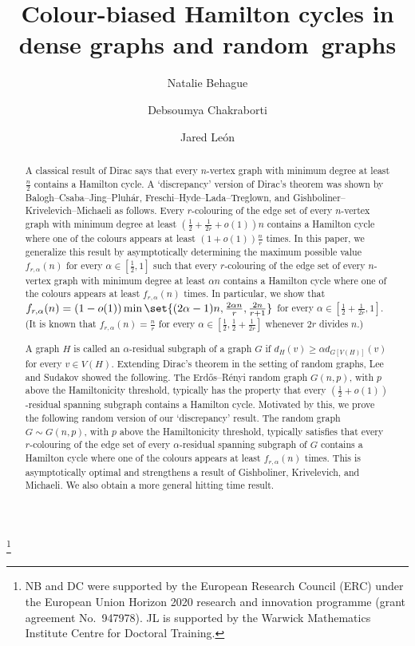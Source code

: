 \documentclass[10pt,a4paper,reqno]{amsart}
\begin{document}
\title{Colour-biased Hamilton cycles in dense graphs and random~graphs}

\author[Behague]{Natalie Behague}
\author[Chakraborti]{Debsoumya Chakraborti}
\author[León]{Jared León}

\address{Mathematics Institute, University of Warwick, Coventry, UK}

\thanks{NB and DC were supported by the European Research Council (ERC) under the European Union Horizon 2020 research and innovation programme (grant agreement No.\ 947978). JL is supported by the Warwick Mathematics Institute Centre for Doctoral Training.}

\begin{abstract}
A classical result of Dirac says that every $n$-vertex graph with minimum degree at least $\frac{n}{2}$ contains a Hamilton cycle. A `discrepancy' version of Dirac's theorem was shown by Balogh--Csaba--Jing--Pluh\'ar, Freschi--Hyde--Lada--Treglown, and Gishboliner--Krivelevich--Michaeli as follows. Every $r$-colouring of the edge set of every $n$-vertex graph with minimum degree at least $(\frac{1}{2} + \frac{1}{2r} + o(1))n$ contains a Hamilton cycle where one of the colours appears at least $(1+o(1))\frac{n}{r}$ times. In this paper, we generalize this result by asymptotically determining the maximum possible value $f_{r,\alpha}(n)$ for every $\alpha \in [\frac{1}{2}, 1]$ such that every $r$-colouring of the edge set of every $n$-vertex graph with minimum degree at least $\alpha n$ contains a Hamilton cycle where one of the colours appears at least $f_{r,\alpha}(n)$ times. In particular, we show that $f_{r,\alpha}(n) = (1-o(1)) \min\set{(2\alpha - 1)n, \frac{2\alpha n}{r}, \frac{2n}{r+1}}$ for every $\alpha\in [\frac{1}{2} + \frac{1}{2r}, 1]$. (It is known that $f_{r,\alpha}(n) = \frac{n}{r}$ for every $\alpha\in [\frac{1}{2},\frac{1}{2} + \frac{1}{2r}]$ whenever $2r$ divides $n$.)


A graph $H$ is called an $\alpha$-residual subgraph of a graph $G$ if $d_H(v)\ge \alpha d_{G[V(H)]}(v)$ for every $v\in V(H)$. Extending Dirac's theorem in the setting of random graphs, Lee and Sudakov showed the following. The Erd\H{o}s--R\'enyi random graph $G(n,p)$, with $p$ above the Hamiltonicity threshold, typically has the property that every $(\frac{1}{2} +o(1))$-residual spanning subgraph contains a Hamilton cycle. Motivated by this, we prove the following random version of our `discrepancy' result. The random graph $G \sim G(n,p)$, with $p$ above the Hamiltonicity threshold, typically satisfies that every $r$-colouring of the edge set of every $\alpha$-residual spanning subgraph of $G$ contains a Hamilton cycle where one of the colours appears at least $f_{r,\alpha}(n)$ times. This is asymptotically optimal and strengthens a result of Gishboliner, Krivelevich, and Michaeli. We also obtain a more general hitting time result. 
\end{abstract}
\end{document}
